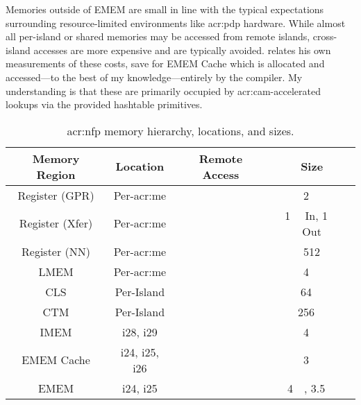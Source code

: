 Memories outside of EMEM are small in line with the typical expectations surrounding resource-limited environments like \gls{acr:pdp} hardware.
While almost all per-island or shared memories may be accessed from remote islands, cross-island accesses are more expensive and are typically avoided.
\Textcite[p.~30]{langlet-ml-netronome} relates his own measurements of these costs, save for EMEM Cache which is allocated and accessed---to the best of my knowledge---entirely by the compiler.
My understanding is that these are primarily occupied by \gls{acr:cam}-accelerated lookups via the provided hashtable primitives.

\begin{table}
	\centering
	\caption[NFP memory hierarchy, locations, and sizes.]{\gls{acr:nfp} memory hierarchy, locations, and sizes.\label{tab:nfp-adx-mem}}
	\begin{tabular}{@{}cccc@{}}
		\toprule
		Memory Region & Location & Remote Access & Size \\
		\midrule
		Register (GPR) & Per-\gls{acr:me} & \xmark & \qty{2}{\kibi\byte} \\
		Register (Xfer) & Per-\gls{acr:me} & \cmark & \qty{1}{\kibi\byte} In, \qty{1}{\kibi\byte} Out \\
		Register (NN) & Per-\gls{acr:me} & \xmark & \qty{512}{\byte} \\
		LMEM & Per-\gls{acr:me} & \xmark & \qty{4}{\kibi\byte} \\
		CLS & Per-Island & \cmark & \qty{64}{\kibi\byte} \\
		CTM & Per-Island & \cmark & \qty{256}{\kibi\byte} \\
		IMEM & i28, i29 & \cmark & \qty{4}{\mebi\byte} \\
		EMEM Cache & i24, i25, i26 & \cmark& \qty{3}{\mebi\byte} \\
		EMEM & i24, i25 & \cmark & \qty{4}{\gibi\byte}, \qty{3.5}{\gibi\byte}\\
		\bottomrule
	\end{tabular}
\end{table}

